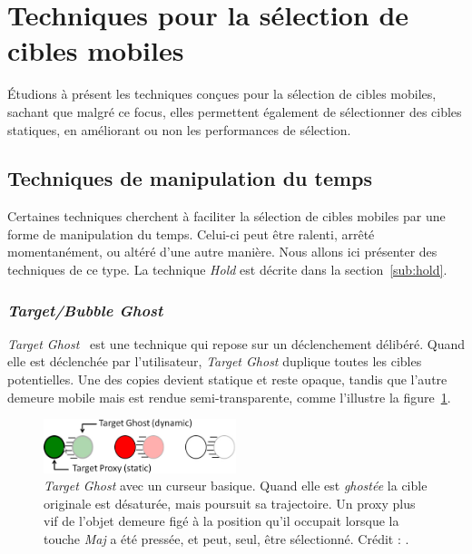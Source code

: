 \section{Techniques pour la sélection de cibles mobiles}
	Étudions à présent les techniques conçues pour la sélection de cibles mobiles, sachant que malgré ce focus, elles permettent également de sélectionner des cibles statiques, en améliorant ou non les performances de sélection.
	
	\subsection{Techniques de manipulation du temps}
	\label{sub:timeLord}
	Certaines techniques cherchent à faciliter la sélection de cibles mobiles par une forme de manipulation du temps. Celui-ci peut être ralenti, arrêté momentanément, ou altéré d'une autre manière. Nous allons ici présenter des techniques de ce type.	La technique \emph{Hold} est décrite dans la section~\ref{sub:hold}.
	
	\subsubsection{\emph{Target/Bubble Ghost}}
	\emph{Target Ghost}~\cite{hasan2011comet} est une technique qui repose sur un déclenchement délibéré. Quand elle est déclenchée par l'utilisateur, \emph{Target Ghost} duplique toutes les cibles potentielles. Une des copies devient statique et reste opaque, tandis que l'autre demeure mobile mais est rendue semi-transparente, comme l'illustre la figure~\ref{fig:targetGhost}.
	
	\begin{figure}[htbp]
		\centering
		\includegraphics[width=0.5\textwidth]{figures/ch2/targetGhost}
		\caption[La technique \emph{Target Ghost}]{\emph{Target Ghost} avec un curseur basique. Quand elle est \og \emph{ghostée} \fg{} la cible originale est désaturée, mais poursuit sa trajectoire. Un proxy plus vif de l'objet demeure figé à la position qu'il occupait lorsque la touche \emph{Maj} a été pressée, et peut, seul, être sélectionné. Crédit : \cite{hasan2011comet}.}
		\label{fig:targetGhost}
	\end{figure}
	
